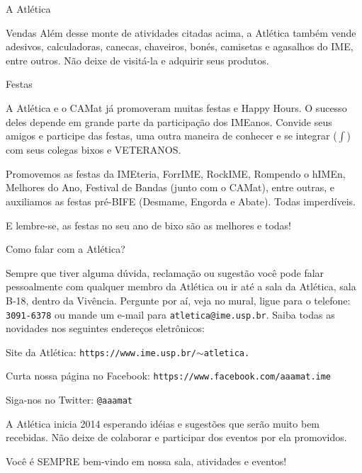 \begin{secao}{A Atlética}
\begin{subsecao}{Vendas}
Além desse monte de atividades citadas acima, a Atlética também vende
adesivos, calculadoras, canecas, chaveiros, bonés, camisetas e agasalhos do IME,
entre outros. Não deixe de visitá-la e adquirir seus produtos.

\end{subsecao}

\begin{subsecao}{Festas}

A Atlética e o CAMat já promoveram muitas festas e Happy Hours. O sucesso
deles depende em grande parte da participação dos IMEanos. Convide seus
amigos e participe das festas, uma outra maneira de conhecer e se
integrar ($\int$) com seus colegas bixos e VETERANOS.

Promovemos as festas da IMEteria, ForrIME, RockIME, Rompendo o hIMEn,
Melhores do Ano, Festival de Bandas (junto com o CAMat), entre outras, e
auxiliamos as festas pré-BIFE (Desmame, Engorda e Abate). Todas imperdíveis.

E lembre-se, as festas no seu ano de bixo são as melhores e todas!

\end{subsecao}

\begin{subsecao}{Como falar com a Atlética?}

Sempre que tiver alguma dúvida, reclamação ou sugestão você pode falar
pessoalmente com qualquer membro da Atlética ou ir até a sala da Atlética, sala
B-18, dentro da Vivência. Pergunte por aí, veja no mural, ligue para o
telefone: {\tt 3091-6378} ou mande um e-mail para {\tt atletica@ime.usp.br}.
Saiba todas as novidades nos seguintes endereços eletrônicos:

Site da Atlética: {\tt https://www.ime.usp.br/$\sim$atletica.}

Curta nossa página no Facebook: {\tt https://www.facebook.com/aaamat.ime}

Siga-nos no Twitter: {\tt @aaamat}

A Atlética inicia 2014 esperando idéias e sugestões que serão muito bem
recebidas. Não deixe de colaborar e participar dos eventos por ela promovidos.

Você é SEMPRE bem-vindo em nossa sala, atividades e eventos!

\end{subsecao}
\end{secao}
